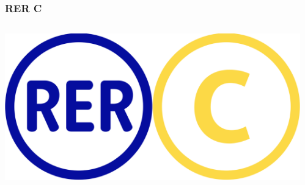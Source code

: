 \documentclass[table]{beamer}
\begin{document}
\begin{frame}
  \frametitle{RER C}

  \begin{columns}
    \begin{column}{0.2\linewidth}
      \includegraphics[width=\linewidth]{images/rer-c-logo}      
    \end{column}
    \begin{column}{0.3\linewidth}

\end{column}
\end{columns}
\end{frame}
\end{document}
